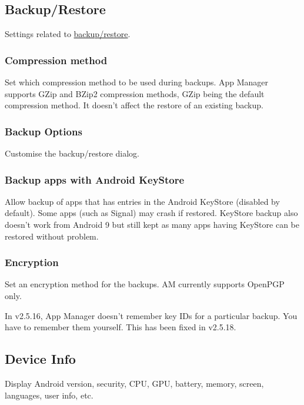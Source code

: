 \subsection{Backup/Restore}\label{subsec:backup/restore}
Settings related to \hyperref[sec:backup-restore]{backup/restore}.

\subsubsection{Compression method}
Set which compression method to be used during backups. App Manager supports GZip and BZip2 compression methods, GZip
being the default compression method. It doesn't affect the restore of an existing backup.

\subsubsection{Backup Options}\label{subsubsec:settings-backup-options}
Customise the backup/restore dialog.

\subsubsection{Backup apps with Android KeyStore}
Allow backup of apps that has entries in the Android KeyStore (disabled by default). Some apps (such as Signal) may
crash if restored. KeyStore backup also doesn't work from Android 9 but still kept as many apps having KeyStore can be
restored without problem.

\subsubsection{Encryption}\label{subsubsec:settings-encryption}
Set an encryption method for the backups. AM currently supports OpenPGP only.

\begin{warning}[Caution]
    In v2.5.16, App Manager doesn't remember key IDs for a particular backup. You have to remember them yourself. This has been fixed in v2.5.18.
\end{warning}

\subsection{Device Info}\label{subsec:device-info}
Display Android version, security, CPU, GPU, battery, memory, screen, languages, user info, etc.
